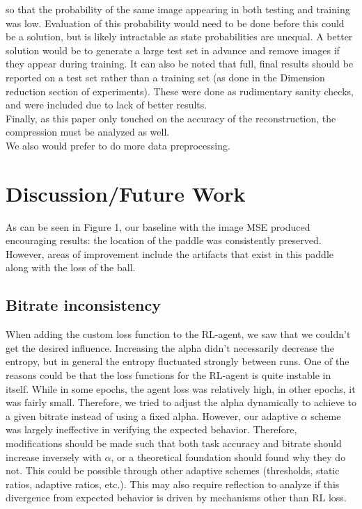 so that the probability of the same image appearing in both testing and training
was low. Evaluation of this probability would need to be done before this could
be a solution, but is likely intractable as state probabilities are unequal. A
better solution would be to generate a large test set in advance and remove
images if they appear during training. It can also be noted that full, final
results should be reported on a test set rather than a training set (as done in
the Dimension reduction section of experiments). These were done as rudimentary
sanity checks, and were included due to lack of better results.\\
Finally, as this paper only touched on the accuracy of the reconstruction, the
compression must be analyzed as well. \\
We also would prefer to do more data preprocessing.


\section{Discussion/Future Work}
As can be seen in Figure 1, our baseline with the image MSE produced encouraging
results: the location of the paddle was consistently preserved. However, areas
of improvement include the artifacts that exist in this paddle along with the
loss of the ball.\\
\subsection{Bitrate inconsistency}
When adding the custom loss function to the RL-agent, we saw that we couldn't
get the desired influence. Increasing the alpha didn't necessarily decrease the
entropy, but in general the entropy fluctuated strongly between runs. One
of the reasons could be that the loss functions for the RL-agent is quite
instable in itself. While in some epochs, the agent loss was relatively high, in
other epochs, it was fairly small. Therefore, we tried to adjust the alpha
dynamically to achieve to a given bitrate instead of using a fixed alpha.
However, our adaptive $\alpha$ scheme was largely ineffective in verifying the
expected behavior. Therefore, modifications should be made such that both task
accuracy and bitrate should increase inversely with $\alpha$, or a theoretical
foundation should found why they do not. This could be possible through other
adaptive schemes (thresholds, static ratios, adaptive ratios, etc.). This may
also require reflection to analyze if this divergence from expected behavior is
driven by mechanisms other than RL loss.

